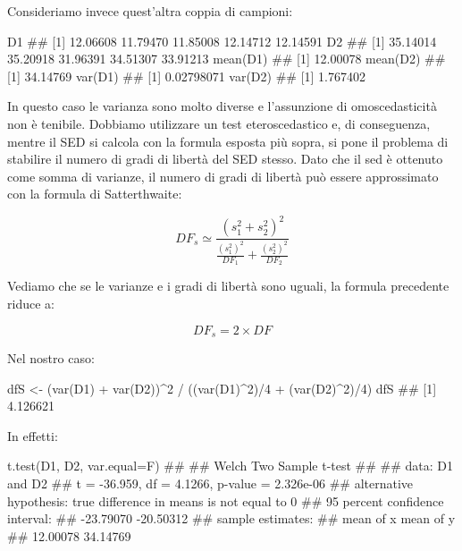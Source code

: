 \documentclass[a4paper,12pt,oneside]{book}
\newenvironment{Shaded}{}{}
\newcommand{\KeywordTok}[1]{#1}
\newcommand{\DataTypeTok}[1]{#1}
\newcommand{\DecValTok}[1]{#1}
\newcommand{\StringTok}[1]{#1}
\newcommand{\CommentTok}[1]{#1}
\newcommand{\OperatorTok}[1]{#1}
\newcommand{\NormalTok}[1]{#1}
\begin{document}
Consideriamo invece quest'altra coppia di campioni:

\begin{Shaded}
\begin{Highlighting}[]
\NormalTok{D1}
\CommentTok{## [1] 12.06608 11.79470 11.85008 12.14712 12.14591}
\NormalTok{D2}
\CommentTok{## [1] 35.14014 35.20918 31.96391 34.51307 33.91213}
\KeywordTok{mean}\NormalTok{(D1)}
\CommentTok{## [1] 12.00078}
\KeywordTok{mean}\NormalTok{(D2)}
\CommentTok{## [1] 34.14769}
\KeywordTok{var}\NormalTok{(D1)}
\CommentTok{## [1] 0.02798071}
\KeywordTok{var}\NormalTok{(D2)}
\CommentTok{## [1] 1.767402}
\end{Highlighting}
\end{Shaded}

In questo caso le varianza sono molto diverse e l'assunzione di omoscedasticità non è tenibile. Dobbiamo utilizzare un test eteroscedastico e, di conseguenza, mentre il SED si calcola con la formula esposta più sopra, si pone il problema di stabilire il numero di gradi di libertà del SED stesso. Dato che il sed è ottenuto come somma di varianze, il numero di gradi di libertà può essere approssimato con la formula di Satterthwaite:

\[DF_s \simeq \frac{ \left( s^2_1 + s^2_2 \right)^2 }{ \frac{(s^2_1)^2}{DF_1} + \frac{(s^2_2)^2}{DF_2} }\]

Vediamo che se le varianze e i gradi di libertà sono uguali, la formula precedente riduce a:

\[DF_s = 2 \times DF\]

Nel nostro caso:

\begin{Shaded}
\begin{Highlighting}[]
\NormalTok{dfS <-}\StringTok{ }\NormalTok{(}\KeywordTok{var}\NormalTok{(D1) }\OperatorTok{+}\StringTok{ }\KeywordTok{var}\NormalTok{(D2))}\OperatorTok{^}\DecValTok{2} \OperatorTok{/}\StringTok{ }
\StringTok{  }\NormalTok{((}\KeywordTok{var}\NormalTok{(D1)}\OperatorTok{^}\DecValTok{2}\NormalTok{)}\OperatorTok{/}\DecValTok{4} \OperatorTok{+}\StringTok{ }\NormalTok{(}\KeywordTok{var}\NormalTok{(D2)}\OperatorTok{^}\DecValTok{2}\NormalTok{)}\OperatorTok{/}\DecValTok{4}\NormalTok{)}
\NormalTok{dfS}
\CommentTok{## [1] 4.126621}
\end{Highlighting}
\end{Shaded}

In effetti:

\begin{Shaded}
\begin{Highlighting}[]
\KeywordTok{t.test}\NormalTok{(D1, D2, }\DataTypeTok{var.equal=}\NormalTok{F)}
\CommentTok{## }
\CommentTok{##  Welch Two Sample t-test}
\CommentTok{## }
\CommentTok{## data:  D1 and D2}
\CommentTok{## t = -36.959, df = 4.1266, p-value = 2.326e-06}
\CommentTok{## alternative hypothesis: true difference in means is not equal to 0}
\CommentTok{## 95 percent confidence interval:}
\CommentTok{##  -23.79070 -20.50312}
\CommentTok{## sample estimates:}
\CommentTok{## mean of x mean of y }
\CommentTok{##  12.00078  34.14769}
\end{Highlighting}
\end{Shaded}
\end{document}
